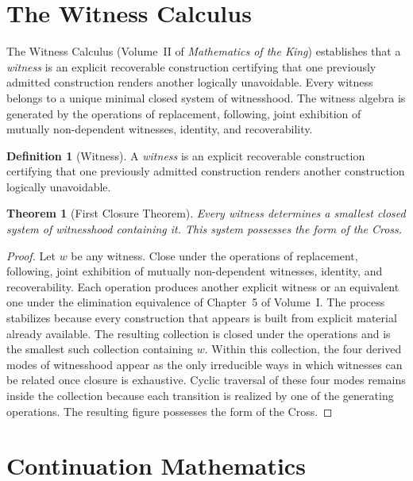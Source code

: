\documentclass[12pt,anyside]{book}
\theoremstyle{plain}
\newtheorem{theorem}{Theorem}[chapter]
\theoremstyle{definition}
\newtheorem{definition}{Definition}[chapter]
\begin{document}
\section{The Witness Calculus}

The Witness Calculus (Volume~II of \emph{Mathematics of the King}) establishes that a \emph{witness} is an explicit recoverable construction certifying that one previously admitted construction renders another logically unavoidable. Every witness belongs to a unique minimal closed system of witnesshood. The witness algebra is generated by the operations of replacement, following, joint exhibition of mutually non-dependent witnesses, identity, and recoverability.

\begin{definition}[Witness]\label{def:witness}
A \emph{witness} is an explicit recoverable construction certifying that one previously admitted construction renders another construction logically unavoidable.
\end{definition}

\begin{theorem}[First Closure Theorem]\label{thm:firstclosure}
Every witness determines a smallest closed system of witnesshood containing it. This system possesses the form of the Cross.
\end{theorem}

\begin{proof}
Let $w$ be any witness. Close under the operations of replacement, following, joint exhibition of mutually non-dependent witnesses, identity, and recoverability. Each operation produces another explicit witness or an equivalent one under the elimination equivalence of Chapter~5 of Volume~I. The process stabilizes because every construction that appears is built from explicit material already available. The resulting collection is closed under the operations and is the smallest such collection containing $w$. Within this collection, the four derived modes of witnesshood appear as the only irreducible ways in which witnesses can be related once closure is exhaustive. Cyclic traversal of these four modes remains inside the collection because each transition is realized by one of the generating operations. The resulting figure possesses the form of the Cross.
\end{proof}

\section{Continuation Mathematics}
\end{document}
